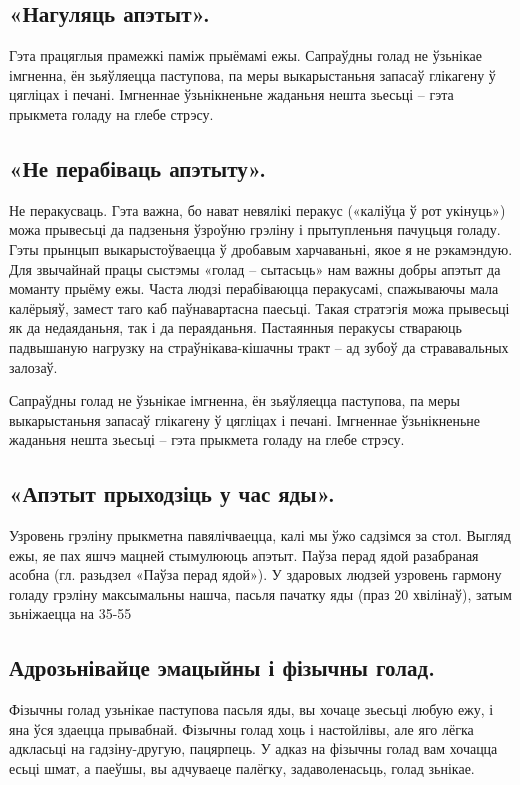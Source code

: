 \subsection{«Нагуляць апэтыт».}
Гэта працяглыя прамежкі паміж прыёмамі ежы. Сапраўдны голад не ўзьнікае імгненна, ён зьяўляецца паступова, па меры выкарыстаньня запасаў глікагену ў цягліцах і печані. Імгненнае ўзьнікненьне жаданьня нешта зьесьці – гэта прыкмета голаду на глебе стрэсу.

\subsection{«Не перабіваць апэтыту».}
Не перакусваць. Гэта важна, бо нават невялікі перакус («каліўца ў рот укінуць») можа прывесьці да падзеньня ўзроўню грэліну і прытупленьня пачуцьця голаду. Гэты прынцып выкарыстоўваецца ў дробавым харчаваньні, якое я не рэкамэндую. Для звычайнай працы сыстэмы «голад – сытасьць» нам важны добры апэтыт да моманту прыёму ежы. Часта людзі перабіваюцца перакусамі, спажываючы мала калёрыяў, замест таго каб паўнавартасна паесьці. Такая стратэгія можа прывесьці як да недаяданьня, так і да пераяданьня. Пастаянныя перакусы ствараюць падвышаную нагрузку на страўнікава-кішачны тракт – ад зубоў да стрававальных залозаў.

Сапраўдны голад не ўзьнікае імгненна, ён зьяўляецца паступова, па меры выкарыстаньня запасаў глікагену ў цягліцах і печані. Імгненнае ўзьнікненьне жаданьня нешта зьесьці – гэта прыкмета голаду на глебе стрэсу.

\subsection{«Апэтыт прыходзіць у час яды».}
Узровень грэліну прыкметна павялічваецца, калі мы ўжо садзімся за стол. Выгляд ежы, яе пах яшчэ мацней стымулююць апэтыт. Паўза перад ядой разабраная асобна (гл. разьдзел «Паўза перад ядой»). У здаровых людзей узровень гармону голаду грэліну максымальны нашча, пасьля пачатку яды (праз 20 хвілінаў), затым зьніжаецца на 35-55%

\subsection{Адрозьнівайце эмацыйны і фізычны голад.}
Фізычны голад узьнікае паступова пасьля яды, вы хочаце зьесьці любую ежу, і яна ўся здаецца прывабнай. Фізычны голад хоць і настойлівы, але яго лёгка адкласьці на гадзіну-другую, пацярпець. У адказ на фізычны голад вам хочацца есьці шмат, а паеўшы, вы адчуваеце палёгку, задаволенасьць, голад зьнікае.

